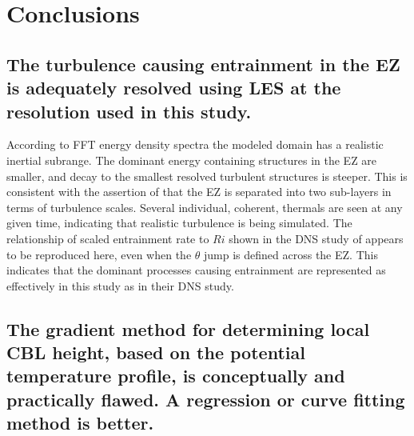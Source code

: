 \section{Conclusions}
\subsection{The turbulence causing entrainment in the EZ is adequately resolved using LES at the resolution used in this study.}

According to FFT energy density spectra the modeled domain has a realistic inertial subrange.  The dominant energy containing structures in the EZ are smaller, and decay to the smallest resolved turbulent structures is steeper. This is consistent with the assertion of \cite{GarciaMellado} that the EZ is separated into two sub-layers in terms of turbulence scales.  Several individual, coherent, thermals are seen at any given time, indicating that realistic turbulence is being simulated.  The relationship of scaled entrainment rate to $Ri$ shown in the DNS study of \cite{GarciaMellado} appears to be reproduced here, even when the $\theta$ jump is defined across the EZ.  This indicates that the dominant processes causing entrainment are represented as effectively in this study as in their DNS study.

\subsection{The gradient method for determining local CBL height, based on the potential temperature profile, is conceptually and practically flawed.  A regression or curve fitting method is better.}

